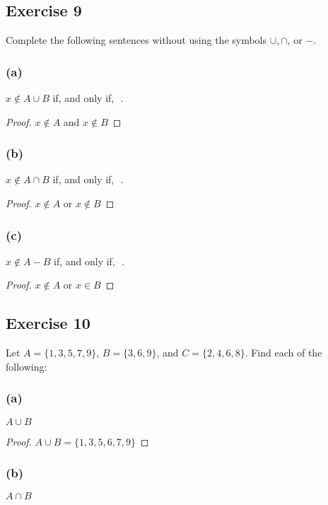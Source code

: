 \documentclass[14pt]{extarticle}
\newcommand{\fbl}{\underline{\hspace{1cm}}\,\,}
\begin{document}
\subsection{Exercise 9}
Complete the following sentences without using the symbols \(\cup, \cap\), or $-$.

\subsubsection{(a)}
\(x \notin A \cup B\) if, and only if, \fbl.

\begin{proof}
  \(x \notin A\) and \(x \notin B\)
\end{proof}

\subsubsection{(b)}
\(x \notin A \cap B\) if, and only if, \fbl.

\begin{proof}
  \(x \notin A\) or \(x \notin B\)
\end{proof}

\subsubsection{(c)}
\(x \notin A - B\) if, and only if, \fbl.

\begin{proof}
  \(x \notin A\) or \(x \in B\)
\end{proof}

\subsection{Exercise 10}
Let \(A = \{1, 3, 5, 7, 9\}\), \(B = \{3, 6, 9\}\), and \(C = \{2, 4, 6, 8\}\). Find each of the following:

\subsubsection{(a)}
\(A \cup B\)

\begin{proof}
  \(A \cup B = \{1, 3, 5, 6, 7, 9\}\)
\end{proof}

\subsubsection{(b)}
\(A \cap B\)
\end{document}
